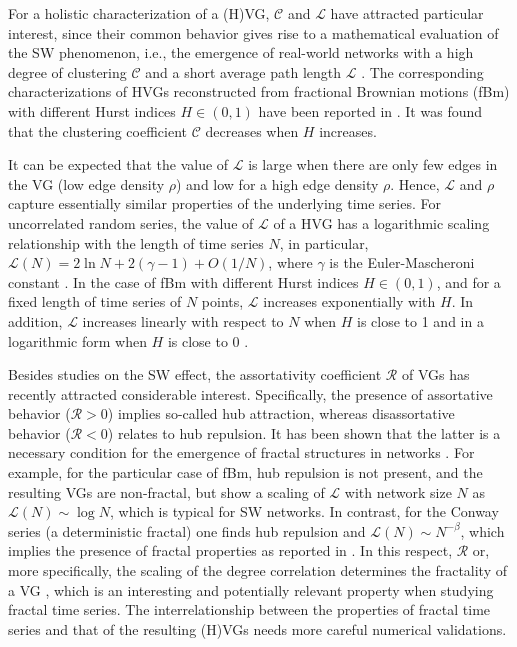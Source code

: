 		For a holistic characterization of a (H)VG, $\mathcal{C}$ and $\mathcal{L}$ have attracted particular interest, since their common behavior gives rise to a mathematical evaluation of the SW phenomenon, i.e., the emergence of real-world networks with a high degree of clustering $\mathcal{C}$ and a short average path length $\mathcal{L}$ \cite{Watts1998}. The corresponding characterizations of HVGs reconstructed from fractional Brownian motions (fBm) with different Hurst indices $H \in (0, 1)$ have been reported in \cite{Xie2011}. It was found that the clustering coefficient $\mathcal{C}$ decreases when $H$ increases. 
		
		It can be expected that the value of $\mathcal{L}$ is large when there are only few edges in the VG (low edge density $\rho$) and low for a high edge density $\rho$. Hence, $\mathcal{L}$ and $\rho$ capture essentially similar properties of the underlying time series. For uncorrelated random series, the value of $\mathcal{L}$ of a HVG has a logarithmic scaling relationship with the length of time series $N$, in particular, $\mathcal{L}(N) = 2 \ln N + 2 (\gamma - 1) + O(1/N)$, where $\gamma$ is the Euler-Mascheroni constant \cite{Luque2009}. In the case of fBm with different Hurst indices $H \in (0, 1)$, and for a fixed length of time series of $N$ points, $\mathcal{L}$ increases exponentially with $H$. In addition, $\mathcal{L}$ increases linearly with respect to $N$ when $H$ is close to 1 and in a logarithmic form when $H$ is close to 0 \cite{Xie2011}. 
	
		Besides studies on the SW effect, the assortativity coefficient $\mathcal{R}$ of VGs has recently attracted considerable interest. Specifically, the presence of assortative behavior ($\mathcal{R} > 0$) implies so-called hub attraction, whereas disassortative behavior ($\mathcal{R} < 0$) relates to hub repulsion. It has been shown that the latter is a necessary condition for the emergence of fractal structures in networks \cite{Song2006}. For example, for the particular case of fBm, hub repulsion is not present, and the resulting VGs are non-fractal, but show a scaling of $\mathcal{L}$ with network size $N$ as $\mathcal{L}(N)\sim \log N$, which is typical for SW networks. In contrast, for the Conway series (a deterministic fractal) one finds hub repulsion and $\mathcal{L}(N)\sim N^{-\beta}$, which implies the presence of fractal properties as reported in \cite{Lacasa2008}. In this respect, $\mathcal{R}$ or, more specifically, the scaling of the degree correlation determines the fractality of a VG \cite{Song2006}, which is an interesting and potentially relevant property when studying fractal time series. The interrelationship between the properties of fractal time series and that of the resulting (H)VGs needs more careful numerical validations. 	
	
